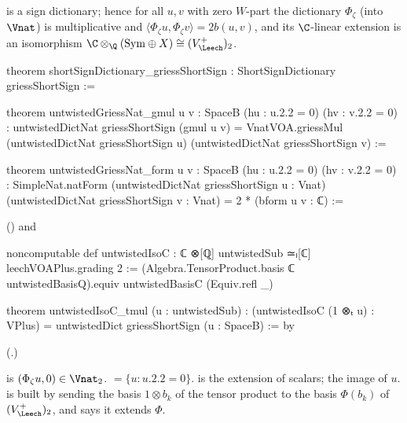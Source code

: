 \begin{theorem}\label{ch21:thm:griessShortSign}
 is a sign dictionary; hence for all $u,v$ with zero $W$-part the dictionary
$\Phi_\zeta$ (into $\Vnat$) is multiplicative and $\langle\Phi_\zeta u,\Phi_\zeta v\rangle=2b(u,v)$, and its
$\C$-linear extension is an isomorphism $\C\otimes_\Q(\chXXISym\oplus X)\cong(V_\Leech^+)_2$.
\end{theorem}
\begin{leancode}
theorem shortSignDictionary_griessShortSign : ShortSignDictionary griessShortSign :=
\end{leancode}
\begin{leancode}
theorem untwistedGriessNat_gmul {u v : SpaceB} (hu : u.2.2 = 0) (hv : v.2.2 = 0) :
    untwistedDictNat griessShortSign (gmul u v)
      = VnatVOA.griessMul (untwistedDictNat griessShortSign u)
          (untwistedDictNat griessShortSign v) :=
\end{leancode}
\begin{leancode}
theorem untwistedGriessNat_form {u v : SpaceB} (hu : u.2.2 = 0) (hv : v.2.2 = 0) :
    SimpleNat.natForm (untwistedDictNat griessShortSign u : Vnat)
        (untwistedDictNat griessShortSign v : Vnat) = 2 * (bform u v : ℂ) :=
\end{leancode}
() and
\begin{leancode}
noncomputable def untwistedIsoC : ℂ ⊗[ℚ] untwistedSub ≃ₗ[ℂ] leechVOAPlus.grading 2 :=
  (Algebra.TensorProduct.basis ℂ untwistedBasisQ).equiv untwistedBasisC (Equiv.refl _)
\end{leancode}
\begin{leancode}
theorem untwistedIsoC_tmul (u : untwistedSub) :
    (untwistedIsoC (1 ⊗ₜ u) : VPlus) = untwistedDict griessShortSign (u : SpaceB) := by
\end{leancode}
(.)
\begin{dictionary}
 is $(\Phi_\zeta u,0)\in\Vnat_2$.   $=\{u:u.2.2=0\}$.
 is the extension of scalars;  the image of $u$.  
is built by sending the basis $1\otimes b_k$ of the tensor product to the basis $\Phi(b_k)$ of
$(V_\Leech^+)_2$, and  says it extends $\Phi$.
\end{dictionary}

